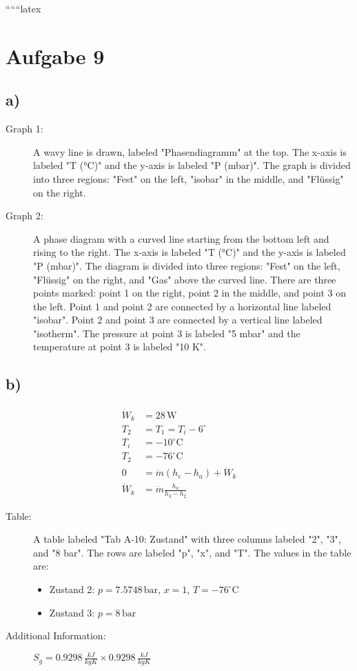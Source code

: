 
``````latex


\section*{Aufgabe 9}

\subsection*{a)}

\begin{description}
    \item[Graph 1:] A wavy line is drawn, labeled "Phasendiagramm" at the top. The x-axis is labeled "T (°C)" and the y-axis is labeled "P (mbar)". The graph is divided into three regions: "Fest" on the left, "isobar" in the middle, and "Flüssig" on the right.
    \item[Graph 2:] A phase diagram with a curved line starting from the bottom left and rising to the right. The x-axis is labeled "T (°C)" and the y-axis is labeled "P (mbar)". The diagram is divided into three regions: "Fest" on the left, "Flüssig" on the right, and "Gas" above the curved line. There are three points marked: point 1 on the right, point 2 in the middle, and point 3 on the left. Point 1 and point 2 are connected by a horizontal line labeled "isobar". Point 2 and point 3 are connected by a vertical line labeled "isotherm". The pressure at point 3 is labeled "5 mbar" and the temperature at point 3 is labeled "10 K".
\end{description}

\subsection*{b)}

\begin{align*}
    \dot{W}_k &= 28 \, \text{W} \\
    T_2 &= T_1 = T_i - 6^\circ \\
    T_i &= -10^\circ \text{C} \\
    T_2 &= \boxed{-76^\circ \text{C}} \\
    0 &= \dot{m} (h_e - h_a) + \dot{W}_k \\
    \dot{W}_k &= \dot{m} \frac{h_a}{h_3 - h_2}
\end{align*}

\begin{description}
    \item[Table:] A table labeled "Tab A-10: Zustand" with three columns labeled "2", "3", and "8 bar". The rows are labeled "p", "x", and "T". The values in the table are:
    \begin{itemize}
        \item Zustand 2: $p = 7.5748 \, \text{bar}$, $x = 1$, $T = -76^\circ \text{C}$
        \item Zustand 3: $p = 8 \, \text{bar}$
    \end{itemize}
    \item[Additional Information:] $S_g = 0.9298 \, \frac{kJ}{kgK} \times 0.9298 \, \frac{kJ}{kgK}$
\end{description}

